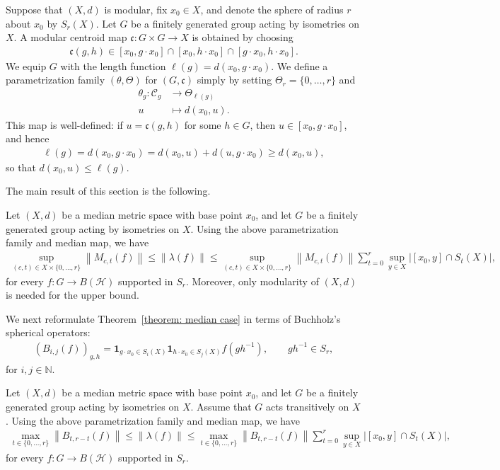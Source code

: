 \documentclass[12pt,reqno]{amsart}
\newcommand{\N}{\mathbb{N}}
\newcommand{\norm}[1]{\left\|#1\right\|}
\newcommand{\Hil}{\mathcal{H}}
\numberwithin{equation}{section}
\begin{document}
Suppose that $(X,d)$ is modular, fix $x_0\in X$, and denote the sphere of radius $r$ about $x_0$ by $S_r(X)$. Let $G$ be a finitely generated group acting by isometries on $X$. A modular centroid map $\mathfrak{c}:G\times G\to X$ is obtained by choosing 
\begin{align}\label{equation: centroid in modular cases}
    \mathfrak{c}(g,h)\in [x_0,g\cdot x_0]\cap [x_0,h\cdot x_0]\cap [g\cdot x_0,h\cdot x_0].
\end{align}
We equip $G$ with the length function $\ell(g)=d(x_0,g\cdot x_0)$. We define a parametrization family $(\theta,\Theta)$ for $(G,\mathfrak{c})$ simply by setting $\Theta_r=\{0,\ldots, r\}$ and
\begin{equation*}
    \begin{aligned}
        \theta_g \colon \mathcal{C}_g &\longrightarrow \Theta_{\ell(g)} \\
                u &\longmapsto d(x_0,u).
    \end{aligned}
\end{equation*}
This map is well-defined: if $u=\mathfrak{c}(g,h)$ for some $h\in G$, then $u\in[x_0,g\cdot x_0]$, and hence
\begin{align*}
    \ell(g)=d(x_0,g\cdot x_0)=d(x_0,u)+d(u,g\cdot x_0)\ge d(x_0,u),
\end{align*}
so that $d(x_0,u)\le \ell(g)$.


The main result of this section is the following.
\begin{theorem}\label{theorem: median case}
    Let $(X,d)$ be a median metric space with base point $x_0$, and let $G$ be a finitely generated group acting by isometries on $X$. Using the above parametrization family and median map, we have
    \begin{align*}
        \sup_{(c,t)\in X\times \{0,\ldots, r\}}\norm{M_{c,t}(f)}\le \norm{\lambda(f)}\le \sup_{(c,t)\in X\times\{0,\ldots, r\}}\norm{M_{c,t}(f)}\sum_{t=0}^r\sup_{y\in X}|[x_0,y]\cap S_{t}(X)|,
    \end{align*}
    for every $f:G\to B(\Hil)$ supported in $S_r$. Moreover, only modularity of $(X,d)$ is needed for the upper bound.
\end{theorem}
We next reformulate Theorem~\ref{theorem: median case} in terms of Buchholz's spherical operators:
\begin{align*}
    (B_{i,j}(f))_{g,h}=\mathbf{1}_{g\cdot x_0\in S_i(X)}\mathbf{1}_{h\cdot x_0\in S_j(X)}f(gh^{-1}),\qquad gh^{-1}\in S_r,
\end{align*}
for $i,j\in \N$.
\begin{corollary}\label{corollary: Buchholz median case}
    Let $(X,d)$ be a median metric space with base point $x_0$, and let $G$ be a finitely generated group acting by isometries on $X$. Assume that $G$ acts transitively on $X$.
    Using the above parametrization family and median map, we have
    \begin{align*}
        \max_{t\in \{0,\ldots, r\}}\norm{B_{t,r-t}(f)}\le \norm{\lambda(f)}\le \max_{t\in \{0,\ldots, r\}}\norm{B_{t,r-t}(f)}\sum_{t=0}^r\sup_{y\in X}|[x_0,y]\cap S_{t}(X)|,
    \end{align*}
    for every $f:G\to B(\Hil)$ supported in $S_r$.
\end{corollary}
\end{document}
